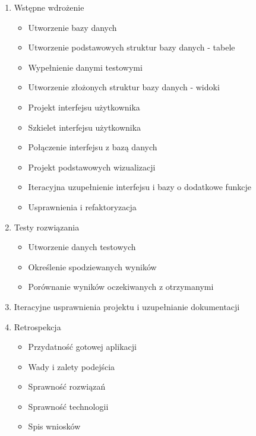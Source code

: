 \documentclass[a4paper,10pt, twoside]{report}
\begin{document}
{\begin{enumerate}
\begin{itemize}
    \end{itemize}
    \item Wstępne wdrożenie
    \begin{itemize}
        \item Utworzenie bazy danych
        \item Utworzenie podstawowych struktur bazy danych - tabele
        \item Wypełnienie danymi testowymi
        \item Utworzenie złożonych struktur bazy danych - widoki
        \item Projekt interfejsu użytkownika
        \item Szkielet interfejsu użytkownika
        \item Połączenie interfejsu z bazą danych
        \item Projekt podstawowych wizualizacji
        \item Iteracyjna uzupełnienie interfejsu i bazy o dodatkowe funkcje
        \item Usprawnienia i refaktoryzacja
    \end{itemize}
    \item Testy rozwiązania
    \begin{itemize}
        \item Utworzenie danych testowych
        \item Określenie spodziewanych wyników
        \item Porównanie wyników oczekiwanych z otrzymanymi
    \end{itemize}
    \item Iteracyjne usprawnienia projektu i uzupełnianie dokumentacji
    \item Retrospekcja
    \begin{itemize}
        \item Przydatność gotowej aplikacji
        \item Wady i zalety podejścia
        \item Sprawność rozwiązań
        \item Sprawność technologii
        \item Spis wniosków
    \end{itemize}
\end{enumerate}
}

\end{document}
